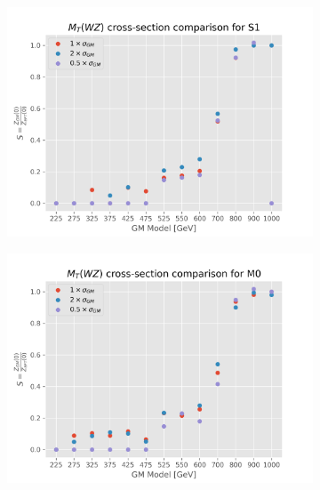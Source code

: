 \documentclass[../Bachelorarbeit.tex]{subfiles}
\begin{document}
\begin{figure}[h]
    \centering
    \begin{subfigure}{0.45\textwidth}
        \includegraphics[width=\textwidth]{Plots/gm_relevanze/MTWZ_comparision_S1.png}

    \end{subfigure}
    \begin{subfigure}{0.45\textwidth}
        \includegraphics[width=\textwidth]{Plots/gm_relevanze/MTWZ_comparision_M0.png}


\end{subfigure}
\end{figure}
\end{document}
